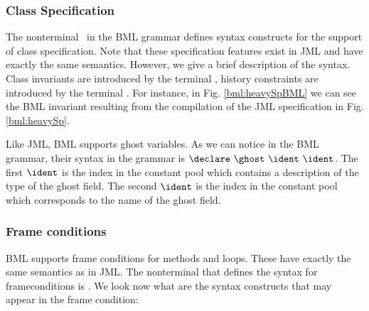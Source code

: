 \subsubsection{Class Specification}
 The nonterminal  \ClassSpec \ in the BML grammar defines syntax constructs for the
 support of class specification. Note that these specification features exist in JML
 and have exactly the same semantics. 
 However, we give a brief description of the syntax. 
 Class invariants are introduced by the terminal
 \ClassInv, history constraints are introduced by the terminal \ClassHistoryConstr. 
 For instance, in Fig. \ref{bml:heavySpBML} we can see the BML invariant resulting from the
 compilation of the JML specification in Fig. \ref{bml:heavySp}. 

 Like JML, BML supports ghost variables. 
 As we can notice in the BML grammar, their syntax in the grammar is 
 $\declare \ \ghost \ \ident  \ \ident$. The first $\ident$ is the index in the constant pool which contains a description 
of the type of the ghost field. The second $\ident$ is the index in the constant pool which corresponds to the name of the ghost field.


 
\subsubsection{Frame conditions} 
BML supports frame conditions for methods and loops. These have exactly the same semantics as in JML. 
The nonterminal that defines the syntax for frameconditions is  \modifiesLoc.
We look now what are the syntax constructs that may appear in the frame condition:

